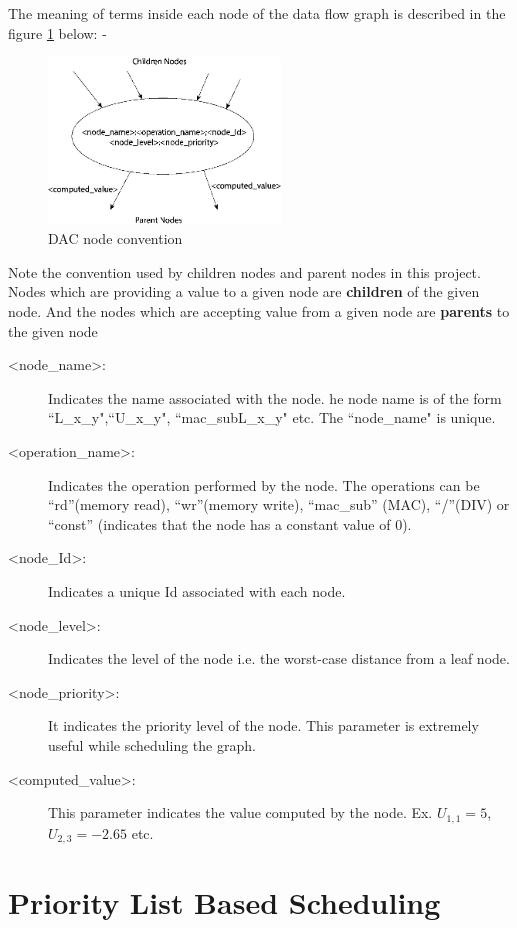 The meaning of terms inside each node of the data flow graph is described in the figure \ref{fig:DAG_mean} below: -
\begin{figure}[H]
    \centering
    \includegraphics[width = 0.55\textwidth]{./Scheduler/image45.png}
    \caption{DAC node convention}
    \label{fig:DAG_mean}
\end{figure}
Note the convention used by children nodes and parent nodes in this project. Nodes which are providing a value to a given node are \textbf{children} of the given node. And the nodes which are accepting value from a given node are \textbf{parents} to the given node

\begin{description}
    \item[<node\_name>:] Indicates the name associated with the node. he node name is of the form ``L\_x\_y",``U\_x\_y", ``mac\_subL\_x\_y" etc. The ``node\_name" is unique.
    \item[<operation\_name>:] Indicates the operation performed by the node. The operations can be ``rd”(memory read), ``wr”(memory write), ``mac\_sub” (MAC), ``/”(DIV) or ``const” (indicates that the node has a constant value of 0).
    \item[<node\_Id>:] Indicates a unique Id associated with each node.
    \item[<node\_level>:] Indicates the level of the node i.e. the worst-case distance from a leaf node.
    \item[<node\_priority>:] It indicates the priority level of the node. This parameter is extremely useful while scheduling the graph.
    \item[<computed\_value>:] This parameter indicates the value computed by the node. Ex. $U_{1,1} = 5$, $U_{2,3} = -2.65$ etc.
\end{description}

\section{Priority List Based Scheduling}

